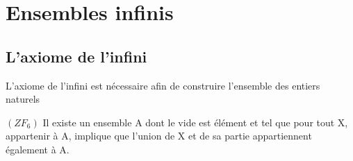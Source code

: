 \documentclass{article}
\title{}
\author{cyrilschkrill}
\begin{document}
\maketitle

\section{Ensembles infinis}
\subsection{L'axiome de l'infini}
L'axiome de l'infini est nécessaire afin de construire l'ensemble des entiers naturels

$(ZF_6)$ Il existe un ensemble A dont le vide est élément et tel que pour tout X, appartenir à A, implique que l'union de X et de sa partie appartiennent également à A. 
\end{document}

